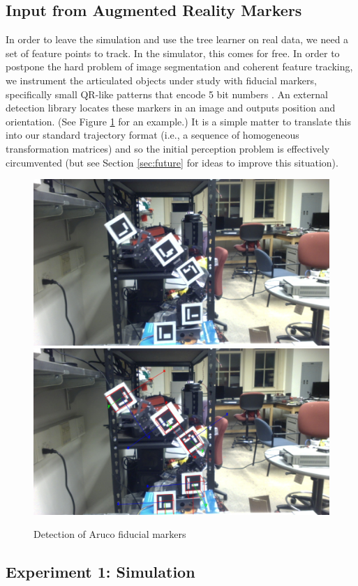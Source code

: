 \documentclass[letterpaper, 10 pt, conference]{ieeeconf}  %
\begin{document}
\subsection{Input from Augmented Reality Markers}
In order to leave the simulation and use the tree learner on real data, we need a set of feature points to track. In the simulator, this comes for free. In order to postpone the hard problem of image segmentation and coherent feature tracking, we instrument the articulated objects under study with fiducial markers, specifically small QR-like patterns that encode 5 bit numbers \cite{aruco}. An external detection library locates these markers in an image and outputs position and orientation. (See Figure \ref{fig:aruco} for an example.) It is a simple matter to translate this into our standard trajectory format (i.e., a sequence of homogeneous transformation matrices) and so the initial perception problem is effectively circumvented (but see Section \ref{sec:future} for ideas to improve this situation).

\begin{figure}[ht]
  \centering
  \includegraphics[width=.235\textwidth,clip,trim=6in 0.1in 7in 7in]{img/armdance_clean_343.jpg}
  \includegraphics[width=.235\textwidth,clip,trim=6in 0.1in 7in 7in]{img/armdance_dirty_343.jpg}
  \caption{Detection of Aruco fiducial markers}
  \label{fig:aruco}
\end{figure}


\subsection{Experiment 1: Simulation}
\end{document}
